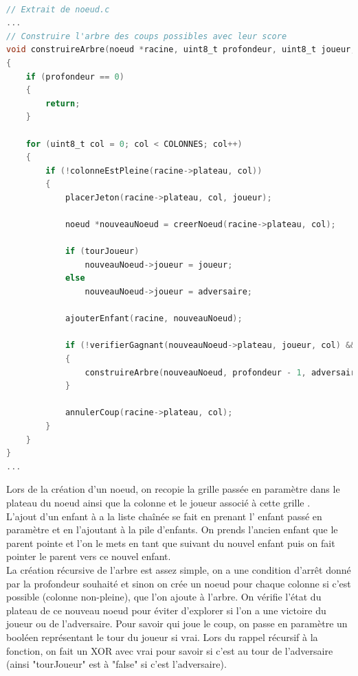 \documentclass[a4paper,fleqn]{article}
\begin{document}
\begin{lstlisting}[language=C, caption=Construction de l'arbre en C]

// Extrait de noeud.c
...
// Construire l'arbre des coups possibles avec leur score
void construireArbre(noeud *racine, uint8_t profondeur, uint8_t joueur, uint8_t adversaire, bool tourJoueur)
{
    if (profondeur == 0)
    {
        return;
    }

    for (uint8_t col = 0; col < COLONNES; col++)
    {
        if (!colonneEstPleine(racine->plateau, col))
        {
            placerJeton(racine->plateau, col, joueur);

            noeud *nouveauNoeud = creerNoeud(racine->plateau, col);

            if (tourJoueur)
                nouveauNoeud->joueur = joueur;
            else
                nouveauNoeud->joueur = adversaire;

            ajouterEnfant(racine, nouveauNoeud);

            if (!verifierGagnant(nouveauNoeud->plateau, joueur, col) && !verifierGagnant(nouveauNoeud->plateau, adversaire, col))
            {
                construireArbre(nouveauNoeud, profondeur - 1, adversaire, joueur, true ^ tourJoueur);
            }
            
            annulerCoup(racine->plateau, col);
        }
    }
}
...
\end{lstlisting}

Lors de la création d'un noeud, on recopie la grille passée en paramètre dans le plateau du noeud ainsi que la colonne et le joueur associé à cette grille .\\

L'ajout d'un enfant à a la liste chaînée se fait en prenant l' enfant passé en paramètre et en l'ajoutant à la pile d'enfants. On prends l'ancien enfant que le parent pointe et l'on le mets en tant que suivant du nouvel enfant puis on fait pointer le parent vers ce nouvel enfant.\\

La création récursive de l'arbre est assez simple, on a une condition d'arrêt donné par la profondeur souhaité et sinon on crée un noeud pour chaque colonne si c'est possible (colonne non-pleine), que l'on ajoute à l'arbre. On vérifie l'état du plateau de ce nouveau noeud pour éviter d'explorer si l'on a une victoire du joueur ou de l'adversaire. Pour savoir qui joue le coup, on passe en paramètre un booléen représentant le tour du joueur si vrai. Lors du rappel récursif à la fonction, on fait un XOR avec vrai pour savoir si c'est au tour de l'adversaire (ainsi "tourJoueur" est à "false" si c'est l'adversaire).
\end{document}
